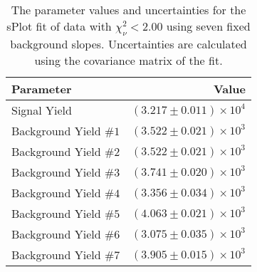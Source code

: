 
\begin{table}[ht]
    \begin{center}
        \begin{tabular}{lr}\toprule
            Parameter & Value \\\midrule
            Signal Yield & $(3.217 \pm 0.011) \times 10^{4}$ \\
            Background Yield $\#1$ & $(3.522 \pm 0.021) \times 10^{3}$ \\
            Background Yield $\#2$ & $(3.522 \pm 0.021) \times 10^{3}$ \\
            Background Yield $\#3$ & $(3.741 \pm 0.020) \times 10^{3}$ \\
            Background Yield $\#4$ & $(3.356 \pm 0.034) \times 10^{3}$ \\
            Background Yield $\#5$ & $(4.063 \pm 0.021) \times 10^{3}$ \\
            Background Yield $\#6$ & $(3.075 \pm 0.035) \times 10^{3}$ \\
            Background Yield $\#7$ & $(3.905 \pm 0.015) \times 10^{3}$ \\\bottomrule
        \end{tabular}
        \caption{The parameter values and uncertainties for the sPlot fit of data with $\chi^2_\nu < 2.00$ using seven fixed background slopes. Uncertainties are calculated using the covariance matrix of the fit.}\label{tab:splot-fit-results-chisqdof-2.00-fixed-7}
    \end{center}
\end{table}
